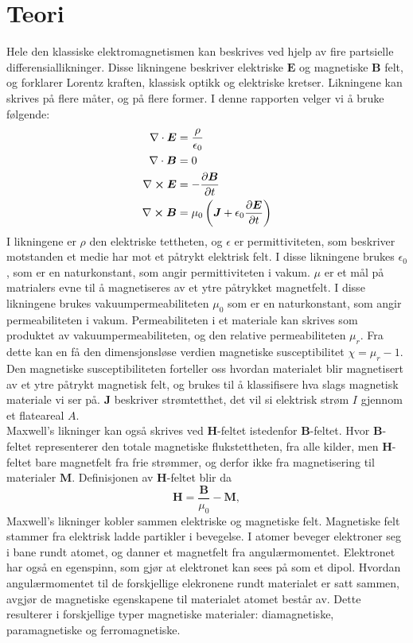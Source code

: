 \documentclass[%
 reprint,
 amsmath,amssymb,
 aps,
 norsk,
]{revtex4-1}
\begin{document}
\section{Teori}
Hele den klassiske elektromagnetismen kan beskrives ved hjelp av fire partsielle differensiallikninger. Disse likningene beskriver elektriske $\bm{E}$ og magnetiske $\bm{B}$ felt, og forklarer Lorentz kraften, klassisk optikk og elektriske kretser. Likningene kan skrives på flere måter, og på flere former. I denne rapporten velger vi å bruke følgende:
\begin{align}
  \nabla \cdot \bm{E} &= \frac{\rho}{\epsilon_0} \label{1}\\
  \nabla \cdot \bm{B} &= 0 \label{2}\\
  \nabla \cross \bm{E} &= -\pdv{\bm{B}}{t} \label{3}\\
  \nabla \cross \bm{B} &= \mu_0\left(\bm{J} + \epsilon_0\pdv{\bm{E}}{t}\right) \label{4}
\end{align}
I likningene er $\rho$ den elektriske tettheten, og $\epsilon$ er permittiviteten, som beskriver motstanden et medie har mot et påtrykt elektrisk felt. I disse likningene brukes $\epsilon_0$, som er en naturkonstant, som angir permittiviteten i vakum. $\mu$ er et mål på matrialers evne til å magnetiseres av et ytre påtrykket magnetfelt. I disse likningene brukes vakuumpermeabiliteten $\mu_0$ som er en naturkonstant, som angir permeabiliteten i vakum. Permeabiliteten i et materiale kan skrives som produktet av vakuumpermeabiliteten, og den relative permeabiliteten $\mu_r$. Fra dette kan en få den dimensjonsløse verdien magnetiske susceptibilitet $\chi = \mu_r - 1$. Den magnetiske susceptibiliteten forteller oss hvordan materialet blir magnetisert av et ytre påtrykt magnetisk felt, og brukes til å klassifisere hva slags magnetisk materiale vi ser på. $\bm{J}$ beskriver strømtetthet, det vil si elektrisk strøm $I$ gjennom et flateareal $A$. \\
Maxwell's likninger kan også skrives ved $\bm{H}$-feltet istedenfor $\bm{B}$-feltet. Hvor $\bm{B}$-feltet representerer den totale magnetiske flukstettheten, fra alle kilder, men $\bm{H}$-feltet bare magnetfelt fra frie strømmer, og derfor ikke fra magnetisering til materialer $\bm{M}$. Definisjonen av $\bm{H}$-feltet blir da
\begin{equation}
  \bm{H} = \frac{\bm{B}}{\mu_0}-\bm{M}, \label{get_H}
\end{equation}
Maxwell's likninger kobler sammen elektriske og magnetiske felt. Magnetiske felt stammer fra elektrisk ladde partikler i bevegelse. I atomer beveger elektroner seg i bane rundt atomet, og danner et magnetfelt fra angulærmomentet. Elektronet har også en egenspinn, som gjør at elektronet kan sees på som et dipol. Hvordan angulærmomentet til de forskjellige elekronene rundt materialet er satt sammen, avgjør de magnetiske egenskapene til materialet atomet består av. Dette resulterer i forskjellige typer magnetiske materialer: diamagnetiske, paramagnetiske og ferromagnetiske.
\end{document}
